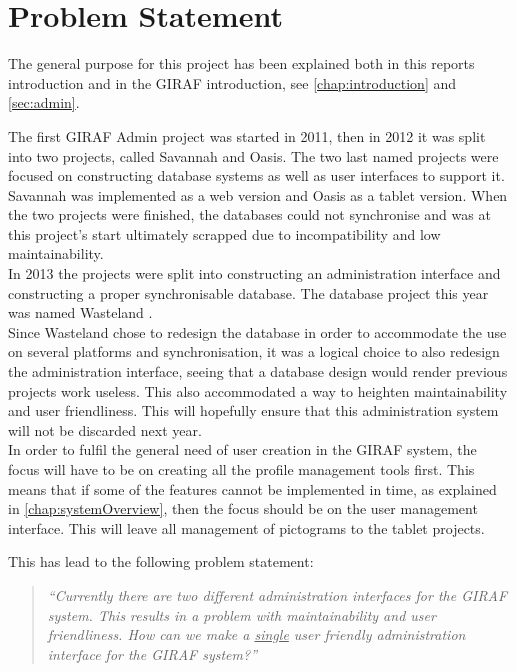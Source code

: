 \chapter{Problem Statement}
\label{chap:problemStatment}
The general purpose for this project has been explained both in this reports introduction and in the GIRAF introduction, see \ref{chap:introduction} and \ref{sec:admin}.

The first GIRAF Admin project was started in 2011, then in 2012 it was split into two projects, called Savannah and Oasis. The two last named projects were focused on constructing database systems as well as user interfaces to support it. Savannah was implemented as a web version and Oasis as a tablet version. When the two projects were finished, the databases could not synchronise and was at this project's start ultimately scrapped due to incompatibility and low maintainability.\\
In 2013 the projects were split into constructing an administration interface and constructing a proper synchronisable database. The database project this year was named Wasteland \citep{wasteland}.\\

Since Wasteland chose to redesign the database in order to accommodate the use on several platforms and synchronisation, it was a logical choice to also redesign the administration interface, seeing that a database design would render previous projects work useless. This also accommodated a way to heighten maintainability and user friendliness. This will hopefully ensure that this administration system will not be discarded next year.\\
In order to fulfil the general need of user creation in the GIRAF system, the focus will have to be on creating all the profile management tools first. This means that if some of the features cannot be implemented in time, as explained in \vref{chap:systemOverview}, then the focus should be on the user management interface. This will leave all management of pictograms to the tablet projects.

This has lead to the following problem statement:
\begin{verse}
\textit{``Currently there are two different administration interfaces for the GIRAF system.
This results in a problem with maintainability and user friendliness.
How can we make a \underline{single} user friendly administration interface for the GIRAF system?''}
\end{verse}
